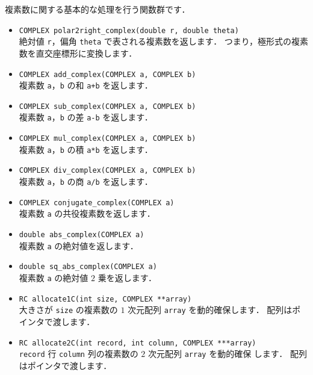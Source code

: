 複素数に関する基本的な処理を行う関数群です．

\begin{itemize}
\item \verb|COMPLEX polar2right_complex(double r, double theta)| \ \\
絶対値 \verb|r|，偏角 \verb|theta| で表される複素数を返します．
つまり，極形式の複素数を直交座標形に変換します．

\item \verb|COMPLEX add_complex(COMPLEX a, COMPLEX b)| \ \\
複素数 \verb|a|，\verb|b| の和 \verb|a+b| を返します．

\item \verb|COMPLEX sub_complex(COMPLEX a, COMPLEX b)| \ \\
複素数 \verb|a|，\verb|b| の差 \verb|a-b| を返します．

\item \verb|COMPLEX mul_complex(COMPLEX a, COMPLEX b)| \ \\
複素数 \verb|a|，\verb|b| の積 \verb|a*b| を返します．

\item \verb|COMPLEX div_complex(COMPLEX a, COMPLEX b)| \ \\
複素数 \verb|a|，\verb|b| の商 \verb|a/b| を返します．

\item \verb|COMPLEX conjugate_complex(COMPLEX a)| \ \\
複素数 \verb|a| の共役複素数を返します．

\item \verb|double abs_complex(COMPLEX a)| \ \\
複素数 \verb|a| の絶対値を返します．

\item \verb|double sq_abs_complex(COMPLEX a)| \ \\
複素数 \verb|a| の絶対値 $2$ 乗を返します．

\item \verb|RC allocate1C(int size, COMPLEX **array)| \ \\
大きさが \verb|size| の複素数の $1$ 次元配列 \verb|array| を動的確保します．
配列はポインタで渡します．

\item \verb|RC allocate2C(int record, int column, COMPLEX ***array)| \ \\
\verb|record| 行 \verb|column| 列の複素数の $2$ 次元配列 \verb|array| を動的確保
します．
配列はポインタで渡します．


\end{itemize}
